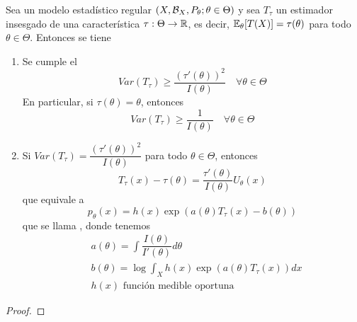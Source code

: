 \begin{teo}
    Sea un modelo estadístico regular \mbox{$(X, \mathcal{B}_{X}, P_{\theta}; \theta \in \Theta)$} y sea $T_{\tau}$ un estimador insesgado de una característica $\tau: \Theta \to \mathbb{R}$, es decir, $\mathbb{E}_{\theta}[T(X)] = \tau(\theta)$ para todo $\theta \in \Theta$. Entonces se tiene 
    \begin{enumerate}[label=\arabic*)]
        \item Se cumple el 
        \begin{equation*}
            Var(T_{\tau}) \geq \dfrac{(\tau'(\theta))^2}{I(\theta)} \quad \forall \theta \in \Theta
        \end{equation*}
        En particular, si $\tau(\theta) = \theta$, entonces
        \begin{equation*}
            Var(T_{\tau}) \geq \dfrac{1}{I(\theta)} \quad \forall \theta \in \Theta
        \end{equation*}
        \item Si $Var(T_{\tau}) = \dfrac{(\tau'(\theta))^2}{I(\theta)}$ para todo $\theta \in \Theta$, entonces 
        \begin{equation*}
            T_{\tau}(x) - \tau(\theta) = \dfrac{\tau'(\theta)}{I(\theta)} U_{\theta}(x)
        \end{equation*}
        que equivale a 
        \begin{equation*}
            p_{\theta}(x) = h(x) \exp\left( a(\theta) T_{\tau}(x) - b(\theta) \right)
        \end{equation*}
        que se llama , donde tenemos
        \begin{align*}
            &a(\theta) = \int \dfrac{I(\theta)}{I'(\theta)} d\theta \\
            &b(\theta) = \log \int_{X} h(x) \exp\left( a(\theta) T_{\tau}(x) \right) dx \\
            &h(x) \text{ función medible oportuna}
        \end{align*}
    \end{enumerate}
    \begin{proof}
    \end{proof}
\end{teo}

